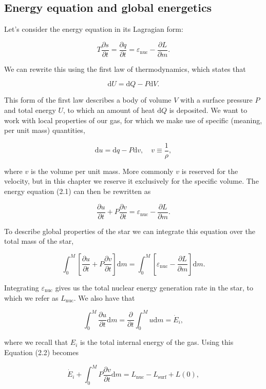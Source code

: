 \documentclass[twocolumn]{article}
\begin{document}
\hypertarget{energy-equation-and-global-energetics}{%
\subsection{Energy equation and global
energetics}\label{energy-equation-and-global-energetics}}

Let's consider the energy equation in its Lagragian form:

\[T\frac{\partial s}{\partial t}=\frac{\partial q}{\partial t}=\varepsilon_\mathrm{nuc}-\frac{\partial L}{\partial m}.\tag{2.1}\]

We can rewrite this using the first law of thermodynamics, which states
that

\[\mathrm{d}U = \mathrm{d}Q - P\mathrm{d}V.\]

This form of the first law describes a body of volume \(V\) with a
surface pressure \(P\) and total energy \(U\), to which an amount of
heat \(\mathrm{d}Q\) is deposited. We want to work with local properties
of our gas, for which we make use of specific (meaning, per unit mass)
quantities,

\[\mathrm{d}u=\mathrm{d}q -P \mathrm{d}v, \quad v\equiv \frac{1}{\rho},\]

where \(v\) is the volume per unit mass. More commonly \(v\) is reserved
for the velocity, but in this chapter we reserve it exclusively for the
specific volume. The energy equation (2.1) can then be rewritten as

\[\frac{\partial u}{\partial t}+P\frac{\partial v}{\partial t}=\varepsilon_\mathrm{nuc}-\frac{\partial L}{\partial m}.\]

To describe global properties of the star we can integrate this equation
over the total mass of the star,

\[\int_0^M\left[\frac{\partial u}{\partial t}+P\frac{\partial v}{\partial t}\right]\mathrm{d}m=\int_0^M\left[\varepsilon_\mathrm{nuc}-\frac{\partial L}{\partial m}\right]\mathrm{d}m.\tag{2.2}\]

Integrating \(\varepsilon_\mathrm{nuc}\) gives us the total nuclear
energy generation rate in the star, to which we refer as
\(L_\mathrm{nuc}\). We also have that

\[\int_0^M\frac{\partial u}{\partial t}\mathrm{d}m=\frac{\partial}{\partial t}\int_0^M u\mathrm{d}m = \dot{E}_i,\]

where we recall that \(E_i\) is the total internal energy of the gas.
Using this Equation (2.2) becomes

\[\dot{E}_i+\int_0^M P\frac{\partial v}{\partial t}\mathrm{d}m=L_\mathrm{nuc}-L_\mathrm{surf}+L(0),\]
\end{document}
